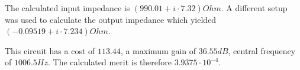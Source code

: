 \par

The calculated input impedance is $(990.01+i\cdot 7.32) Ohm$.
A different setup was used to calculate the output impedance which yielded $(-0.09519+i\cdot 7.234) Ohm$.

This circuit has a cost of $113.44$, a maximum gain of $36.55 dB$, central frequency of $1006.5 Hz$.
The calculated merit is therefore $3.9375\cdot 10^{-4}$.
